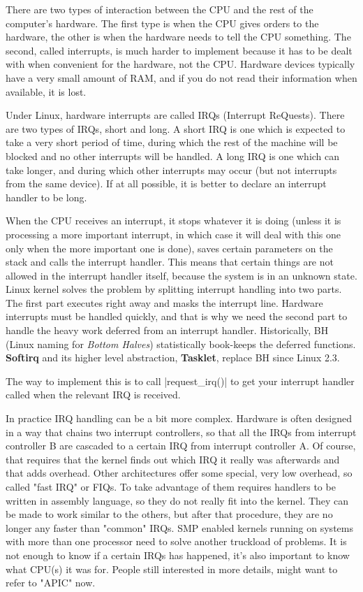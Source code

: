 \documentclass[10pt, oneside]{book}
\begin{document}
There are two types of interaction between the CPU and the rest of the computer's hardware.
The first type is when the CPU gives orders to the hardware, the other is when the hardware needs to tell the CPU something.
The second, called interrupts, is much harder to implement because it has to be dealt with when convenient for the hardware, not the CPU.
Hardware devices typically have a very small amount of RAM, and if you do not read their information when available, it is lost.

Under Linux, hardware interrupts are called IRQs (Interrupt ReQuests).
There are two types of IRQs, short and long.
A short IRQ is one which is expected to take a very short period of time, during which the rest of the machine will be blocked and no other interrupts will be handled.
A long IRQ is one which can take longer, and during which other interrupts may occur (but not interrupts from the same device).
If at all possible, it is better to declare an interrupt handler to be long.

When the CPU receives an interrupt, it stops whatever it is doing (unless it is processing a more important interrupt, in which case it will deal with this one only when the more important one is done),
saves certain parameters on the stack and calls the interrupt handler.
This means that certain things are not allowed in the interrupt handler itself, because the system is in an unknown state.
Linux kernel solves the problem by splitting interrupt handling into two parts.
The first part executes right away and masks the interrupt line.
Hardware interrupts must be handled quickly, and that is why we need the second part to handle the heavy work deferred from an interrupt handler.
Historically, BH (Linux naming for \textit{Bottom Halves}) statistically book-keeps the deferred functions.
\textbf{Softirq} and its higher level abstraction, \textbf{Tasklet}, replace BH since Linux 2.3.

The way to implement this is to call \cpp|request_irq()| to get your interrupt handler called when the relevant IRQ is received.

In practice IRQ handling can be a bit more complex.
Hardware is often designed in a way that chains two interrupt controllers, so that all the IRQs from interrupt controller B are cascaded to a certain IRQ from interrupt controller A.
Of course, that requires that the kernel finds out which IRQ it really was afterwards and that adds overhead. Other architectures offer some special, very low overhead, so called "fast IRQ" or FIQs.
To take advantage of them requires handlers to be written in assembly language, so they do not really fit into the kernel.
They can be made to work similar to the others, but after that procedure, they are no longer any faster than "common" IRQs.
SMP enabled kernels running on systems with more than one processor need to solve another truckload of problems.
It is not enough to know if a certain IRQs has happened, it's also important to know what CPU(s) it was for.
People still interested in more details, might want to refer to "APIC" now.
\end{document}
